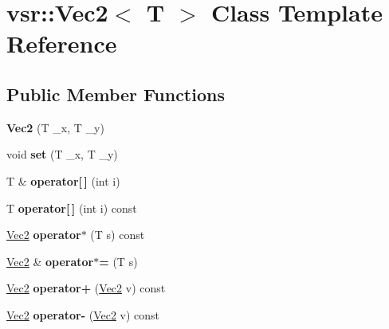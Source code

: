 \hypertarget{classvsr_1_1_vec2}{\section{vsr\-:\-:Vec2$<$ T $>$ Class Template Reference}
\label{classvsr_1_1_vec2}
}
\subsection*{Public Member Functions}
\begin{DoxyCompactItemize}
\item 
\hypertarget{classvsr_1_1_vec2_a0f1f8b6360df0f83abaff4fabbcb67eb}{{\bfseries Vec2} (T \-\_\-x, T \-\_\-y)}\label{classvsr_1_1_vec2_a0f1f8b6360df0f83abaff4fabbcb67eb}

\item 
\hypertarget{classvsr_1_1_vec2_a2e8f1927eecc7fa0386bd0e41086eb8c}{void {\bfseries set} (T \-\_\-x, T \-\_\-y)}\label{classvsr_1_1_vec2_a2e8f1927eecc7fa0386bd0e41086eb8c}

\item 
\hypertarget{classvsr_1_1_vec2_a5db200474240e8f47dccb0818073241d}{T \& {\bfseries operator\mbox{[}$\,$\mbox{]}} (int i)}\label{classvsr_1_1_vec2_a5db200474240e8f47dccb0818073241d}

\item 
\hypertarget{classvsr_1_1_vec2_a5660dee1729f68f5612653c5a82ab1c5}{T {\bfseries operator\mbox{[}$\,$\mbox{]}} (int i) const }\label{classvsr_1_1_vec2_a5660dee1729f68f5612653c5a82ab1c5}

\item 
\hypertarget{classvsr_1_1_vec2_adff74e0b12c22857ed61d74ed8a4cb5f}{\hyperlink{classvsr_1_1_vec2}{Vec2} {\bfseries operator$\ast$} (T s) const }\label{classvsr_1_1_vec2_adff74e0b12c22857ed61d74ed8a4cb5f}

\item 
\hypertarget{classvsr_1_1_vec2_a7fa9a36932e3cb471e3a662e1fbe81b5}{\hyperlink{classvsr_1_1_vec2}{Vec2} \& {\bfseries operator$\ast$=} (T s)}\label{classvsr_1_1_vec2_a7fa9a36932e3cb471e3a662e1fbe81b5}

\item 
\hypertarget{classvsr_1_1_vec2_a83bf2a805b456ac13d05303606ad71d0}{\hyperlink{classvsr_1_1_vec2}{Vec2} {\bfseries operator+} (\hyperlink{classvsr_1_1_vec2}{Vec2} v) const }\label{classvsr_1_1_vec2_a83bf2a805b456ac13d05303606ad71d0}

\item 
\hypertarget{classvsr_1_1_vec2_ab409dfb30a4f48792a2c288f8d692c96}{\hyperlink{classvsr_1_1_vec2}{Vec2} {\bfseries operator-\/} (\hyperlink{classvsr_1_1_vec2}{Vec2} v) const }\label{classvsr_1_1_vec2_ab409dfb30a4f48792a2c288f8d692c96}


\end{DoxyCompactItemize}
